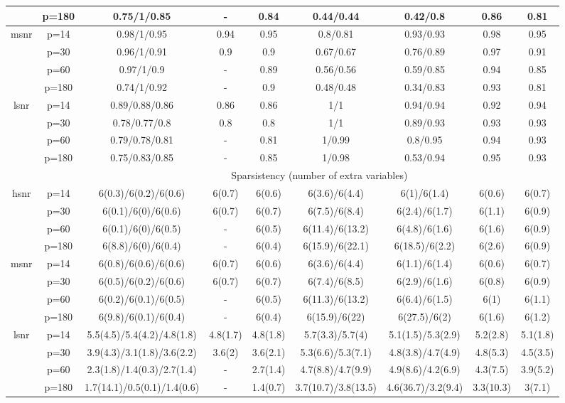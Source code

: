\begin{table}[ht]
{\begin{tabular}{|c|c|ccccccc|}
   & p=180 & 0.75/1/0.85 & - & 0.84 & 0.44/0.44 & 0.42/0.8 & 0.86 & 0.81 \\ 
  \midrule\multirow{4}[2]{*}{msnr} & p=14 & 0.98/1/0.95 & 0.94 & 0.95 & 0.8/0.81 & 0.93/0.93 & 0.98 & 0.95 \\ 
   & p=30 & 0.96/1/0.91 & 0.9 & 0.9 & 0.67/0.67 & 0.76/0.89 & 0.97 & 0.91 \\ 
   & p=60 & 0.97/1/0.9 & - & 0.89 & 0.56/0.56 & 0.59/0.85 & 0.94 & 0.85 \\ 
   & p=180 & 0.74/1/0.92 & - & 0.9 & 0.48/0.48 & 0.34/0.83 & 0.93 & 0.81 \\ 
  \midrule\multirow{4}[2]{*}{lsnr} & p=14 & 0.89/0.88/0.86 & 0.86 & 0.86 & 1/1 & 0.94/0.94 & 0.92 & 0.94 \\ 
   & p=30 & 0.78/0.77/0.8 & 0.8 & 0.8 & 1/1 & 0.89/0.93 & 0.93 & 0.93 \\ 
   & p=60 & 0.79/0.78/0.81 & - & 0.81 & 1/0.99 & 0.8/0.95 & 0.94 & 0.93 \\ 
   & p=180 & 0.75/0.83/0.85 & - & 0.85 & 1/0.98 & 0.53/0.94 & 0.95 & 0.93 \\ 
   \midrule 
 \multicolumn{1}{|c}{} &       & \multicolumn{7}{c|}{Sparsistency (number of extra variables)} \\
\midrule\multirow{4}[2]{*}{hsnr} & p=14 & 6(0.3)/6(0.2)/6(0.6) & 6(0.7) & 6(0.6) & 6(3.6)/6(4.4) & 6(1)/6(1.4) & 6(0.6) & 6(0.7) \\ 
   & p=30 & 6(0.1)/6(0)/6(0.6) & 6(0.7) & 6(0.7) & 6(7.5)/6(8.4) & 6(2.4)/6(1.7) & 6(1.1) & 6(0.9) \\ 
   & p=60 & 6(0.1)/6(0)/6(0.5) & - & 6(0.5) & 6(11.4)/6(13.2) & 6(4.8)/6(1.6) & 6(1.6) & 6(0.9) \\ 
   & p=180 & 6(8.8)/6(0)/6(0.4) & - & 6(0.4) & 6(15.9)/6(22.1) & 6(18.5)/6(2.2) & 6(2.6) & 6(0.9) \\ 
  \midrule\multirow{4}[2]{*}{msnr} & p=14 & 6(0.8)/6(0.6)/6(0.6) & 6(0.7) & 6(0.6) & 6(3.6)/6(4.4) & 6(1.1)/6(1.4) & 6(0.6) & 6(0.7) \\ 
   & p=30 & 6(0.5)/6(0.2)/6(0.6) & 6(0.7) & 6(0.7) & 6(7.4)/6(8.5) & 6(2.9)/6(1.6) & 6(0.8) & 6(0.9) \\ 
   & p=60 & 6(0.2)/6(0.1)/6(0.5) & - & 6(0.5) & 6(11.3)/6(13.2) & 6(6.4)/6(1.5) & 6(1) & 6(1.1) \\ 
   & p=180 & 6(9.8)/6(0.1)/6(0.4) & - & 6(0.4) & 6(15.9)/6(22) & 6(27.5)/6(2) & 6(1.6) & 6(1.2) \\ 
  \midrule\multirow{4}[2]{*}{lsnr} & p=14 & 5.5(4.5)/5.4(4.2)/4.8(1.8) & 4.8(1.7) & 4.8(1.8) & 5.7(3.3)/5.7(4) & 5.1(1.5)/5.3(2.9) & 5.2(2.8) & 5.1(1.8) \\ 
   & p=30 & 3.9(4.3)/3.1(1.8)/3.6(2.2) & 3.6(2) & 3.6(2.1) & 5.3(6.6)/5.3(7.1) & 4.8(3.8)/4.7(4.9) & 4.8(5.3) & 4.5(3.5) \\ 
   & p=60 & 2.3(1.8)/1.4(0.3)/2.7(1.4) & - & 2.7(1.4) & 4.7(8.8)/4.7(9.9) & 4.9(8.6)/4.2(6.9) & 4.3(7.5) & 3.9(5.2) \\ 
   & p=180 & 1.7(14.1)/0.5(0.1)/1.4(0.6) & - & 1.4(0.7) & 3.7(10.7)/3.8(13.5) & 4.6(36.7)/3.2(9.4) & 3.3(10.3) & 3(7.1) \\ 
   \bottomrule 
\end{tabular}
}
\end{table}
